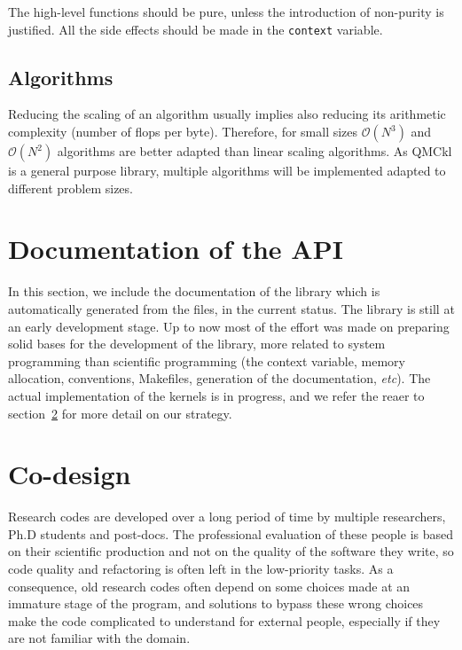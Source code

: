 The high-level  functions should be pure,  unless the introduction
of non-purity is justified. All the side effects should be made in
the \texttt{context} variable.


\subsection{Algorithms}

Reducing the scaling of an  algorithm usually implies also reducing
its arithmetic  complexity (number  of flops per  byte). Therefore,
for  small  sizes   \(\mathcal{O}(N^3)\)  and  \(\mathcal{O}(N^2)\)
algorithms are  better adapted than linear  scaling algorithms.  As
\ac{QMCkl} is a  general purpose library, multiple  algorithms will be
implemented adapted to different problem sizes.



\section{Documentation of the API}

In this section, we include the documentation of the library which is
automatically generated from the {\orgmode} files, in the current status.
The library is still at an early development stage. Up to now most of
the effort was made on preparing solid bases for the development of
the library, more related to system programming than scientific
programming (the context variable, memory allocation, conventions,
Makefiles, generation of the documentation, \textit{etc}). The actual
implementation of the kernels is in progress, and we refer the
reaer to section~\ref{sec:codesign} for more detail on our strategy.


\section{Co-design}
\label{sec:codesign}

Research codes are developed over a long period of time by multiple
researchers, Ph.D students and post-docs. The professional evaluation
of these people is based on their scientific production and not on the
quality of the software they write, so code quality and refactoring is
often left in the low-priority tasks. As a consequence, old research
codes often depend on some choices made at an immature stage of the
program, and solutions to bypass these wrong choices make the code
complicated to understand for external people, especially if they are
not familiar with the domain.


